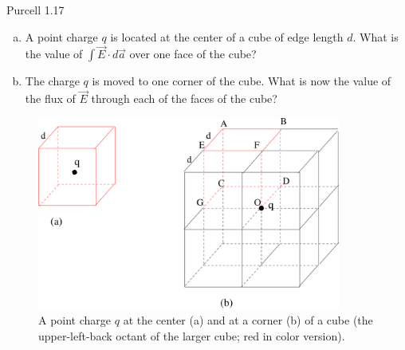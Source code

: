 \documentclass{esg8022pset}
\begin{document}
\begin{problem}{Purcell 1.17}
  \begin{enumerate}[(a)]
    \item A point charge $q$ is located at the center of a cube of edge length $d$. What is the value of $\int \vec E \cdot d\vec a$ over one face of the cube?
    \item The charge $q$ is moved to one corner of the cube. What is now the value of the flux of $\vec E$ through each of the faces of the cube?
  \end{enumerate}
\end{problem}
\begin{solution}
  \begin{figure}[ht]
    \begin{center}
      \includegraphics[width=10cm]{ps02_sol_02}
      \caption{A point charge $q$ at the center (a) and at a corner (b) of a cube (the upper-left-back octant of the larger cube; red in color version).}
      \label{fig:cubeflux6}
    \end{center}
  \end{figure}
  \begin{enumerate}[(a)]

\end{enumerate}
\end{solution}
\end{document}
